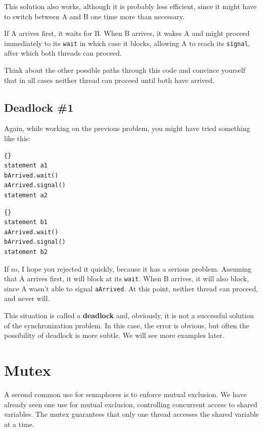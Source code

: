 \documentclass{book}
\begin{document}
This solution also works, although it is probably less
efficient, since it might have to switch between A and B
one time more than necessary.

If A arrives first, it waits for B.  When B arrives, it wakes
A and might proceed immediately to its {\tt wait} in which
case it blocks, allowing A to reach its {\tt signal}, after
which both threads can proceed.

Think about the other possible paths through this code and
convince yourself that in all cases neither thread can
proceed until both have arrived.

\subsection {Deadlock \#1}

Again, while working on the previous problem, you might have
tried something like this:
\begin{minipage}[t]{0.4\textwidth}
    \begin{lstlisting}[title={Thread A}]{}
statement a1
bArrived.wait()
aArrived.signal()
statement a2
\end{lstlisting}
\end{minipage}
\hfill
\begin{minipage}[t]{0.4\textwidth}
    \begin{lstlisting}[title={Thread B}]{}
statement b1
aArrived.wait()
bArrived.signal()
statement b2
\end{lstlisting}
\end{minipage}

If so, I hope you rejected it quickly, because it has a serious
problem.  Assuming that A arrives first, it will block at its
    {\tt wait}.  When B arrives, it will also block, since A wasn't
able to signal {\tt aArrived}.  At this point, neither thread
can proceed, and never will.

This situation is called a {\bf deadlock} and, obviously, it is
not a successful solution of the synchronization problem.  In
this case, the error is obvious, but often the possibility of
deadlock is more subtle.  We will see more examples later.


\section{Mutex}

A second common use for semaphores is to enforce mutual exclusion.
We have already seen one use for mutual exclusion, controlling
concurrent access to shared variables.  The mutex guarantees
that only one thread accesses the shared variable at a time.
\end{document}
